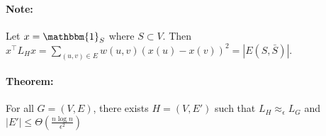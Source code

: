 \documentclass[11pt]{article}
\begin{document}
\paragraph{Note:}

Let $x = \mathbbm{1}_S$ where $S \subset V$. Then $x^{\top} L_H x = \sum_{(u,v) \in E} w(u, v) (x(u)-x(v))^2 = |E(S, \bar{S})|$.


\paragraph{Theorem:}

For all $G=(V, E)$, there exists $H=(V, E')$ such that $L_H \approx_\epsilon L_G$ and $|E'| \le \Theta(\frac{n\log n}{\epsilon^2})$



\printbibliography
\end{document}
